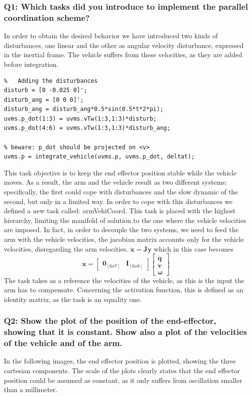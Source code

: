 \documentclass{article}
\begin{document}
\subsubsection{Q1: Which tasks did you introduce to implement the parallel coordination scheme?}
In order to obtain the desired behavior we have introduced two kinds of disturbances, one linear and the other as angular velocity disturbance, expressed in the inertial frame. The vehicle suffers from these velocities, as they are added before integration.
\begin{lstlisting}
%	Adding the disturbances
disturb = [0 -0.025 0]';
disturb_ang = [0 0 0]';
disturb_ang = disturb_ang*0.5*sin(0.5*t*2*pi);
uvms.p_dot(1:3) = uvms.vTw(1:3,1:3)*disturb;
uvms.p_dot(4:6) = uvms.vTw(1:3,1:3)*disturb_ang;
    
% beware: p_dot should be projected on <v>
uvms.p = integrate_vehicle(uvms.p, uvms.p_dot, deltat);
\end{lstlisting}
This task objective is to keep the end effector position stable while the vehicle moves. As a result, the arm and the vehicle result as two different systems: specifically, the first could cope with disturbances and the slow dynamic of the second, but only in a limited way.
In order to cope with this disturbances we defined a new task called: armVehiCoord.
This task is placed with the highest hierarchy, limiting the manifold of solution to the one where the vehicle velocities are imposed. In fact, in order to decouple the two systems, we need to feed the arm with the vehicle velocities, the jacobian matrix accounts only for the vehicle velocities, disregarding the arm velocities.
$ \bm{\dot{x}} = \bm{J\dot{y}} $ which in this case becomes 
$$ \bm{\dot{x}} = \begin{bmatrix} \bm{0}_{[6x7]} & \bm{I}_{[6x6]} \end{bmatrix} \begin{bmatrix} \bm{\dot{q}}   \\ \bm{v} \\ \bm{\omega} \end{bmatrix} $$
The task takes as a reference the velocities of the vehicle, as this is the input the arm has to compensate. Concerning the activation function, this is defined as an identity matrix, as the task is an equality one. 


\subsubsection{Q2: Show the plot of the position of the end-effector, showing that it is constant. Show also a plot of the velocities of the vehicle and of the arm.}
In the following images, the end effector position is plotted, showing the three cartesian components. The scale of the plots clearly states that the end effector position could be assumed as constant, as it only suffers from oscillation smaller than a millimeter. 
\end{document}
